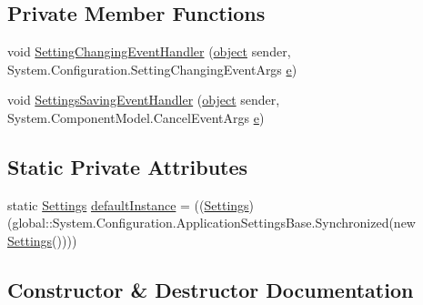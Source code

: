 \subsection*{Private Member Functions}
\begin{DoxyCompactItemize}
\item 
void \hyperlink{class_web_analyzer_1_1_properties_1_1_settings_ade54623f5935cf04300ab15254d1a846}{Setting\+Changing\+Event\+Handler} (\hyperlink{_u_i_2_h_t_m_l_resources_2js_2lib_2underscore_8min_8js_aae18b7515bb2bc4137586506e7c0c903}{object} sender, System.\+Configuration.\+Setting\+Changing\+Event\+Args \hyperlink{_u_i_2_h_t_m_l_resources_2js_2lib_2bootstrap_8min_8js_ab5902775854a8b8440bcd25e0fe1c120}{e})
\item 
void \hyperlink{class_web_analyzer_1_1_properties_1_1_settings_a539f50459d03d0782e76117c5a3ed3eb}{Settings\+Saving\+Event\+Handler} (\hyperlink{_u_i_2_h_t_m_l_resources_2js_2lib_2underscore_8min_8js_aae18b7515bb2bc4137586506e7c0c903}{object} sender, System.\+Component\+Model.\+Cancel\+Event\+Args \hyperlink{_u_i_2_h_t_m_l_resources_2js_2lib_2bootstrap_8min_8js_ab5902775854a8b8440bcd25e0fe1c120}{e})
\end{DoxyCompactItemize}
\subsection*{Static Private Attributes}
\begin{DoxyCompactItemize}
\item 
static \hyperlink{class_web_analyzer_1_1_properties_1_1_settings}{Settings} \hyperlink{class_web_analyzer_1_1_properties_1_1_settings_a384f24a72fe5cd4bd437c9fdecf5e8ce}{default\+Instance} = ((\hyperlink{class_web_analyzer_1_1_properties_1_1_settings}{Settings})(global\+::\+System.\+Configuration.\+Application\+Settings\+Base.\+Synchronized(new \hyperlink{class_web_analyzer_1_1_properties_1_1_settings}{Settings}())))
\end{DoxyCompactItemize}


\subsection{Constructor \& Destructor Documentation}
\hypertarget{class_web_analyzer_1_1_properties_1_1_settings_abe4ec5eb9d0040b8f25200d2b988f110}{}
